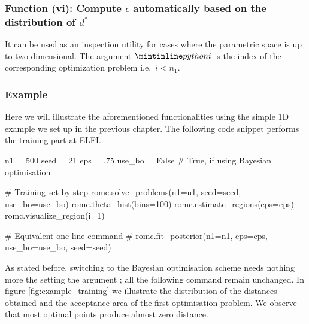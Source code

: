 \subsubsection*{Function (vi): Compute $\epsilon$ automatically based on the distribution of $d^*$}

\vspace{5mm}
\noindent

It can be used as an inspection utility for cases where the parametric
space is up to two dimensional. The argument $\pinline{i}$ is the
index of the corresponding optimization problem i.e.\ $i<n_1$.

\subsubsection*{Example}

Here we will illustrate the aforementioned functionalities using the
simple 1D example we set up in the previous chapter. The following
code snippet performs the training part at ELFI.

\begin{pythoncode}
  n1 = 500
  seed = 21
  eps = .75
  use_bo = False # True, if using Bayesian optimisation

  # Training set-by-step
  romc.solve_problems(n1=n1, seed=seed, use_bo=use_bo)
  romc.theta_hist(bins=100)
  romc.estimate_regions(eps=eps)
  romc.visualize_region(i=1)

  # Equivalent one-line command
  # romc.fit_posterior(n1=n1, eps=eps, use_bo=use_bo, seed=seed)
\end{pythoncode}

As stated before, switching to the Bayesian optimisation scheme needs
nothing more the setting the argument ; all the
following command remain unchanged. In figure
\ref{fig:example_training} we illustrate the distribution of the
distances obtained and the acceptance area of the first optimisation
problem. We observe that most optimal points produce almost zero
distance.

